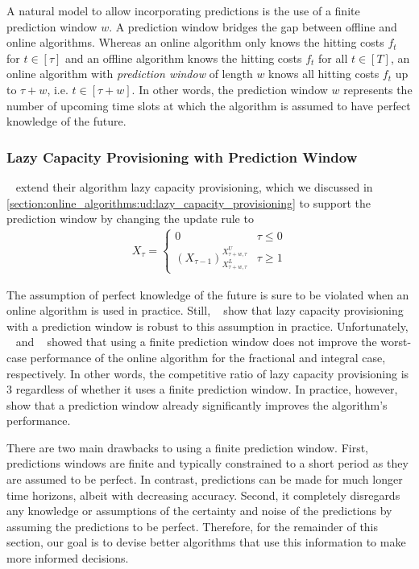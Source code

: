 A natural model to allow incorporating predictions is the use of a finite prediction window $w$. A prediction window bridges the gap between offline and online algorithms. Whereas an online algorithm only knows the hitting costs $f_t$ for $t \in [\tau]$ and an offline algorithm knows the hitting costs $f_t$ for all $t \in [T]$, an online algorithm with \emph{prediction window} of length $w$ knows all hitting costs $f_t$ up to $\tau + w$, i.e. $t \in [\tau + w]$. In other words, the prediction window $w$ represents the number of upcoming time slots at which the algorithm is assumed to have perfect knowledge of the future.

\subsubsection{Lazy Capacity Provisioning with Prediction Window}

\citeauthor*{Lin2011}~\cite{Lin2011} extend their algorithm lazy capacity provisioning, which we discussed in \cref{section:online_algorithms:ud:lazy_capacity_provisioning} to support the prediction window by changing the update rule to \begin{align*}
    X_{\tau} = \begin{cases}
        0 & \tau \leq 0 \\
        (X_{\tau-1})_{X_{\tau+w,\tau}^L}^{X_{\tau+w,\tau}^U} & \tau \geq 1
    \end{cases}
\end{align*}

The assumption of perfect knowledge of the future is sure to be violated when an online algorithm is used in practice. Still, \citeauthor*{Lin2011}~\cite{Lin2011} show that lazy capacity provisioning with a prediction window is robust to this assumption in practice. Unfortunately, \citeauthor*{Lin2011}~\cite{Lin2011} and \citeauthor*{Albers2018}~\cite{Albers2018} showed that using a finite prediction window does not improve the worst-case performance of the online algorithm for the fractional and integral case, respectively. In other words, the competitive ratio of lazy capacity provisioning is $3$ regardless of whether it uses a finite prediction window. In practice, however, \citeauthor*{Lin2011}~\cite{Lin2011} show that a prediction window already significantly improves the algorithm's performance.

There are two main drawbacks to using a finite prediction window. First, predictions windows are finite and typically constrained to a short period as they are assumed to be perfect. In contrast, predictions can be made for much longer time horizons, albeit with decreasing accuracy. Second, it completely disregards any knowledge or assumptions of the certainty and noise of the predictions by assuming the predictions to be perfect. Therefore, for the remainder of this section, our goal is to devise better algorithms that use this information to make more informed decisions.

